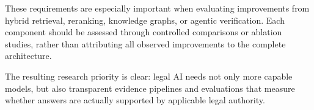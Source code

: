 These requirements are especially important when evaluating improvements from hybrid retrieval,
reranking, knowledge graphs, or agentic verification. Each component should be assessed through
controlled comparisons or ablation studies, rather than attributing all observed improvements to the
complete architecture.

The resulting research priority is clear: legal AI needs not only more capable models, but also
transparent evidence pipelines and evaluations that measure whether answers are actually supported by
applicable legal authority.
